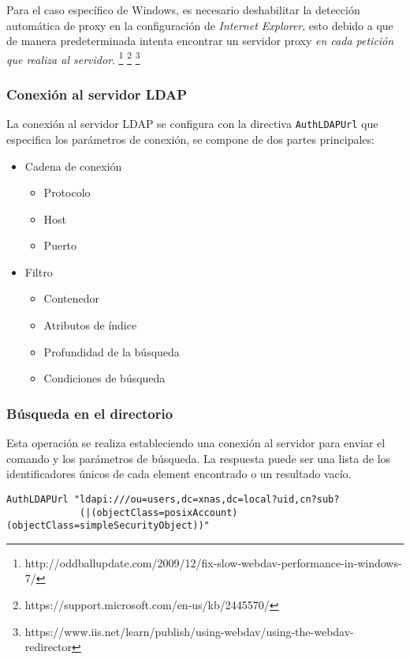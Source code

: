 Para el caso espec\'{i}fico de Windows, es necesario deshabilitar la detecci\'{o}n autom\'{a}tica de proxy en la configuraci\'{o}n de \textit{Internet Explorer}, esto debido a que de manera predeterminada intenta encontrar un servidor proxy \textit{en cada petici\'{o}n que realiza al servidor}.
\footnote{http://oddballupdate.com/2009/12/fix-slow-webdav-performance-in-windows-7/}
\footnote{https://support.microsoft.com/en-us/kb/2445570/}
\footnote{https://www.iis.net/learn/publish/using-webdav/using-the-webdav-redirector}

        \subsubsection {Conexi\'{o}n al servidor \textsc{LDAP}}

La conexi\'{o}n al servidor LDAP se configura con la directiva \texttt{AuthLDAPUrl} que especifica los par\'{a}metros de conexi\'{o}n, se compone de dos partes principales:

\begin{itemize}
  \item Cadena de conexi\'{o}n
  \begin{itemize}
    \item Protocolo
    \item Host
    \item Puerto
  \end{itemize}
  \item Filtro
  \begin{itemize}
    \item Contenedor
    \item Atributos de \'{i}ndice
    \item Profundidad de la b\'{u}squeda
    \item Condiciones de b\'{u}squeda
  \end{itemize}
\end{itemize}

        \subsubsection {B\'{u}squeda en el directorio}

Esta operaci\'{o}n se realiza estableciendo una conexi\'{o}n al servidor para enviar el comando y los par\'{a}metros de b\'{u}squeda. La respuesta puede ser una lista de los identificadores \'{u}nicos de cada element encontrado o un resultado vac\'{i}o.

{
\scriptsize
\linespread{1}
\begin{verbatim}
AuthLDAPUrl "ldapi:///ou=users,dc=xnas,dc=local?uid,cn?sub?
             (|(objectClass=posixAccount)(objectClass=simpleSecurityObject))"
\end{verbatim}
}


